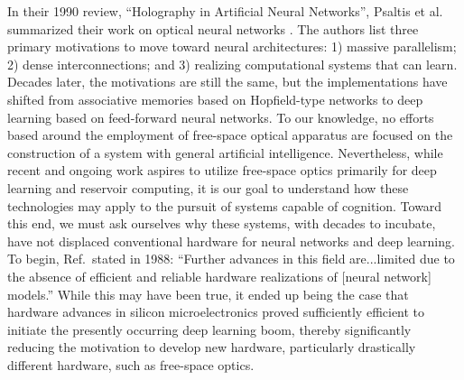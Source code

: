 
In their 1990 review, ``Holography in Artificial Neural Networks'', Psaltis et al. summarized their work on optical neural networks \cite{psbr1990}. The authors list three primary motivations to move toward neural architectures: 1) massive parallelism; 2) dense interconnections; and 3) realizing computational systems that can learn. Decades later, the motivations are still the same, but the implementations have shifted from associative memories based on Hopfield-type networks to deep learning based on feed-forward neural networks. To our knowledge, no efforts based around the employment of free-space optical apparatus are focused on the construction of a system with general artificial intelligence. Nevertheless, while recent and ongoing work aspires to utilize free-space optics primarily for deep learning and reservoir computing, it is our goal to understand how these technologies may apply to the pursuit of systems capable of cognition. Toward this end, we must ask ourselves why these systems, with decades to incubate, have not displaced conventional hardware for neural networks and deep learning. To begin, Ref.\,\cite{agne1988} stated in 1988: ``Further advances in this field are...limited due to the absence of efficient and reliable hardware realizations of [neural network] models.'' While this may have been true, it ended up being the case that hardware advances in silicon microelectronics proved sufficiently efficient to initiate the presently occurring deep learning boom, thereby significantly reducing the motivation to develop new hardware, particularly drastically different hardware, such as free-space optics. 

